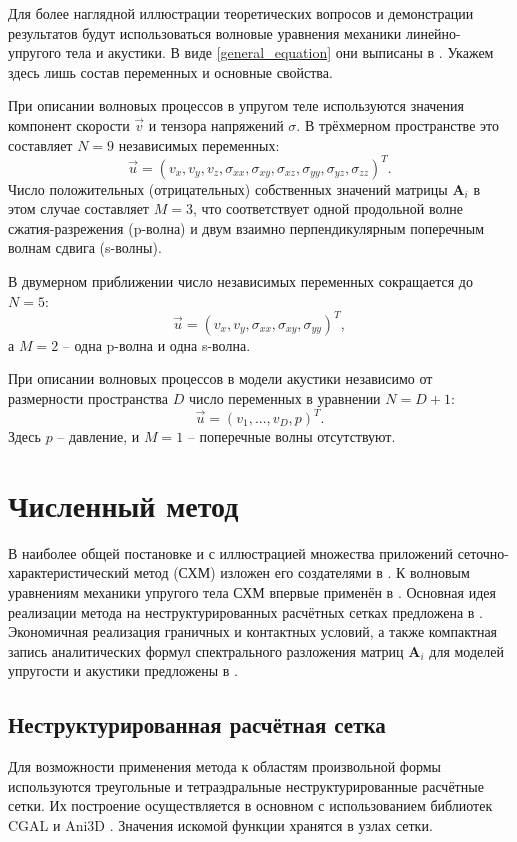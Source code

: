 \documentclass[a4paper]{article}
\numberwithin{equation}{section}
\begin{document}
Для более наглядной иллюстрации теоретических вопросов и 
демонстрации результатов будут использоваться волновые уравнения 
механики линейно-упругого тела и акустики. В виде \eqref{general_equation}
они выписаны в \cite{chelnokov}. Укажем здесь лишь состав переменных 
и основные свойства. 

При описании волновых процессов в упругом теле используются значения 
компонент скорости $\vec{v}$ и тензора напряжений $\sigma$.
В трёхмерном пространстве это составляет $N = 9$ независимых переменных:
\begin{equation}
	\vec{u} = (v_x,v_y,v_z,\sigma_{xx},\sigma_{xy},\sigma_{xz},\sigma_{yy},\sigma_{yz},\sigma_{zz})^{T}.
\end{equation}
Число положительных (отрицательных) собственных значений матрицы $\mathbf{A}_i$ 
в этом случае составляет $M = 3$, что соответствует 
одной продольной волне сжатия-разрежения (p-волна) и 
двум взаимно перпендикулярным поперечным волнам сдвига (s-волны).

В двумерном приближении число независимых переменных сокращается до $N = 5$:
\begin{equation}
	\vec{u} = (v_x,v_y,\sigma_{xx},\sigma_{xy},\sigma_{yy})^{T},
\end{equation}
а $M = 2$ -- одна p-волна и одна s-волна.

При описании волновых процессов в модели акустики независимо от размерности 
пространства $D$ число переменных в уравнении $N = D + 1$:
\begin{equation}
	\vec{u} = (v_1, ..., v_D, p)^T.
\end{equation}
Здесь $p$ -- давление, и $M = 1$ -- поперечные волны отсутствуют.


\section{Численный метод}
В наиболее общей постановке и с иллюстрацией множества приложений 
сеточно-характеристический метод (СХМ) 
изложен его создателями в \cite{magomedov_kholodov_1988}. 
К волновым уравнениям механики упругого тела 
СХМ впервые применён в \cite{petrov_kholodov}.
Основная идея реализации метода на неструктурированных расчётных сетках
предложена в \cite{magomedov_kholodov_1988}. 
Экономичная реализация граничных и контактных условий, а также
компактная запись аналитических формул спектрального разложения 
матриц $\mathbf{A}_i$ для моделей упругости и акустики предложены в \cite{chelnokov}.


\subsection{Неструктурированная расчётная сетка}
Для возможности применения метода к областям произвольной формы используются
треугольные и тетраэдральные неструктурированные расчётные сетки. 
Их построение осуществляется в основном с использованием 
библиотек CGAL \cite{cgal} и Ani3D \cite{ani3d}.
Значения искомой функции хранятся в узлах сетки. 
\end{document}
